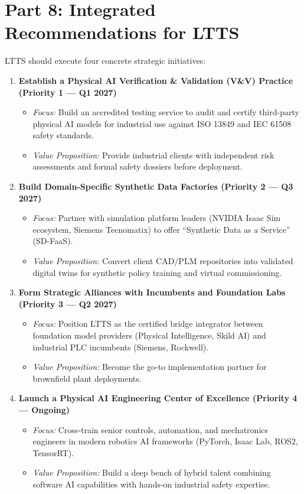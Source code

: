 \documentclass[11pt,a4paper]{article}
\begin{document}
\section{Part 8: Integrated Recommendations for LTTS}

LTTS should execute four concrete strategic initiatives:

\begin{enumerate}
    \item \textbf{Establish a Physical AI Verification \& Validation (V\&V) Practice (Priority 1 --- Q1 2027)}
    \begin{itemize}
        \item \textit{Focus:} Build an accredited testing service to audit and certify third-party physical AI models for industrial use against ISO 13849 and IEC 61508 safety standards.
        \item \textit{Value Proposition:} Provide industrial clients with independent risk assessments and formal safety dossiers before deployment.
    \end{itemize}

    \item \textbf{Build Domain-Specific Synthetic Data Factories (Priority 2 --- Q3 2027)}
    \begin{itemize}
        \item \textit{Focus:} Partner with simulation platform leaders (NVIDIA Isaac Sim ecosystem, Siemens Tecnomatix) to offer ``Synthetic Data as a Service'' (SD-FaaS).
        \item \textit{Value Proposition:} Convert client CAD/PLM repositories into validated digital twins for synthetic policy training and virtual commissioning.
    \end{itemize}

    \item \textbf{Form Strategic Alliances with Incumbents and Foundation Labs (Priority 3 --- Q2 2027)}
    \begin{itemize}
        \item \textit{Focus:} Position LTTS as the certified bridge integrator between foundation model providers (Physical Intelligence, Skild AI) and industrial PLC incumbents (Siemens, Rockwell).
        \item \textit{Value Proposition:} Become the go-to implementation partner for brownfield plant deployments.
    \end{itemize}

    \item \textbf{Launch a Physical AI Engineering Center of Excellence (Priority 4 --- Ongoing)}
    \begin{itemize}
        \item \textit{Focus:} Cross-train senior controls, automation, and mechatronics engineers in modern robotics AI frameworks (PyTorch, Isaac Lab, ROS2, TensorRT).
        \item \textit{Value Proposition:} Build a deep bench of hybrid talent combining software AI capabilities with hands-on industrial safety expertise.
    \end{itemize}
\end{enumerate}
\end{document}
